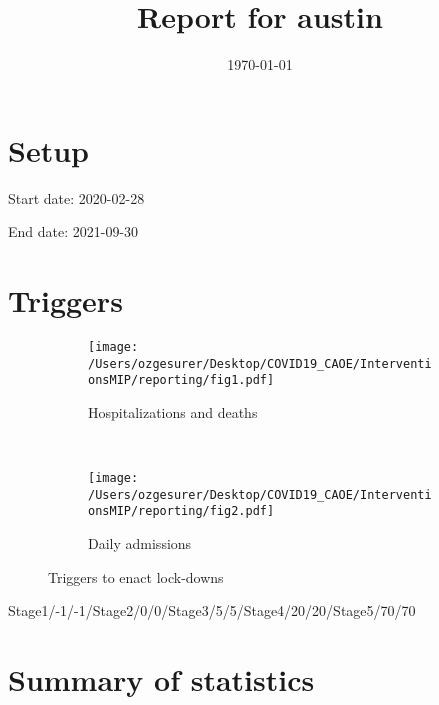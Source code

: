 \documentclass{article}
\title{Report for austin}
\author{}
\date{\today}
\begin{document}
\maketitle

\section*{Setup}

Start date: 2020-02-28

End date: 2021-09-30 




\section*{Triggers}
\begin{figure}[!htb]
  \centering
  \setlength{\unitlength}{1cm}
    \begin{subfigure}[b]{0.475\linewidth}
    \centering
        \texttt{[image: /Users/ozgesurer/Desktop/COVID19\_CAOE/InterventionsMIP/reporting/fig1.pdf]}
        \caption{Hospitalizations  and deaths}
        \label{fig:IHD}
    \end{subfigure}
    ~
    \begin{subfigure}[b]{0.475\linewidth}
    \centering
         \texttt{[image: /Users/ozgesurer/Desktop/COVID19\_CAOE/InterventionsMIP/reporting/fig2.pdf]}
        \caption{Daily admissions}
        \label{fig:IYIH}
    \end{subfigure}
    \caption{Triggers to enact lock-downs}\label{fig:SD90}
\end{figure}

Stage1/-1/-1/Stage2/0/0/Stage3/5/5/Stage4/20/20/Stage5/70/70

\newpage

\section*{Summary of statistics}
\end{document}
